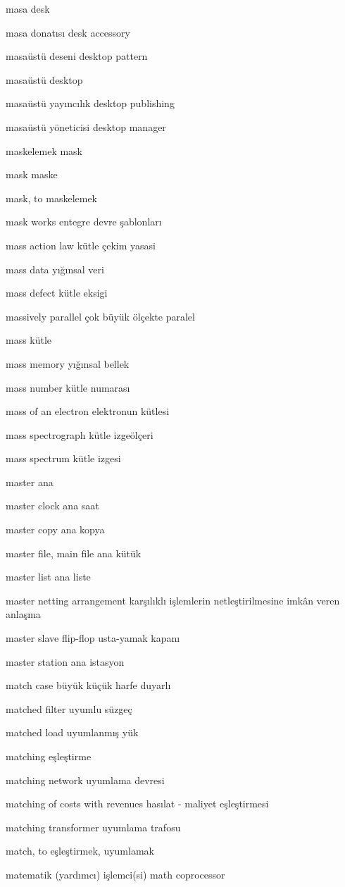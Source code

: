 \documentclass[12pt,fleqn]{article}\usepackage{../../common}
\begin{document}
masa desk

masa donatısı desk accessory

masaüstü deseni desktop pattern

masaüstü desktop

masaüstü yayıncılık desktop publishing

masaüstü yöneticisi desktop manager

maskelemek mask

mask maske

mask, to maskelemek

mask works entegre devre şablonları

mass action law kütle çekim yasasi

mass data yığınsal veri

mass defect kütle eksigi

massively parallel çok büyük ölçekte paralel

mass kütle

mass memory yığınsal bellek

mass number kütle numarası

mass of an electron elektronun kütlesi

mass spectrograph kütle izgeölçeri

mass spectrum kütle izgesi

master ana

master clock ana saat

master copy ana kopya

master file, main file ana kütük

master list ana liste

master netting arrangement karşılıklı işlemlerin netleştirilmesine imkân veren anlaşma

master slave flip-flop usta-yamak kapanı

master station ana istasyon

match case büyük küçük harfe duyarlı

matched filter uyumlu süzgeç

matched load uyumlanmış yük

matching eşleştirme

matching network uyumlama devresi

matching of costs with revenues hasılat - maliyet eşleştirmesi

matching transformer uyumlama trafosu

match, to eşleştirmek, uyumlamak

matematik (yardımcı) işlemci(si) math coprocessor
\end{document}
